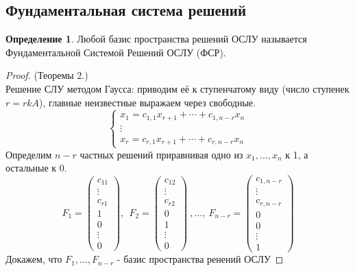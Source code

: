 \documentclass[a4paper, 12pt]{article}
\theoremstyle{definition}
\newtheorem*{definition}{Определение}
\begin{document}
  \subsection{Фундаментальная система решений}
  \begin{definition}
    Любой базис пространства решений ОСЛУ называется \\ Фундаментальной Системой Решений ОСЛУ (ФСР).
  \end{definition} 
  \begin{proof}
    (Теоремы 2.) \\ Решение СЛУ методом Гаусса: приводим её к ступенчатому виду (число ступенек $r=rkA$), главные неизвестные выражаем через свободные. 
    $$\begin{cases}
      x_1=c_{1,1}x_{r+1} + \cdots + c_{1,n-r}x_n \\
      \vdots\\
      x_r=c_{r,1}x_{r+1} + \cdots + c_{r,n-r}x_n
    \end{cases}$$ 
    Определим $n-r$ частных решений приравнивая одно из $x_1,...,x_n$ к 1, а остальные к 0. 
    $$F_1 = \begin{pmatrix}
      c_{11}\\
      \vdots\\
      c_{r1}\\
      \hline
      1\\
      0\\
      \vdots\\
      0
    \end{pmatrix}, \ \ F_2 = \begin{pmatrix}
      c_{12}\\
      \vdots\\
      c_{r2}\\
      \hline
      0\\
      1\\
      \vdots\\
      0
    \end{pmatrix} \ ,..., \ F_{n-r} = \begin{pmatrix}
      c_{1,{n-r}}\\
      \vdots\\
      c_{r,{n-r}}\\
      \hline
      0\\
      0\\
      \vdots\\
      1
    \end{pmatrix}$$  
    Докажем, что $F_1,...,F_{n-r}$ - базис пространства ренений ОСЛУ 

\end{proof}
\end{document}
